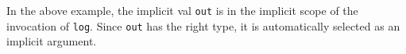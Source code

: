 \documentclass[preprint,nocopyrightspace]{sigplanconf}
\newcommand{\ie}{{\em i.e.,~}}
\newcommand{\term}[1]{\mbox{\texttt{#1}}}
\begin{document}
In the above example, the implicit val \term{out} is in the implicit scope of
the invocation of \term{log}. Since \term{out} has the right type, it is automatically
selected as an implicit argument.

\end{document}
